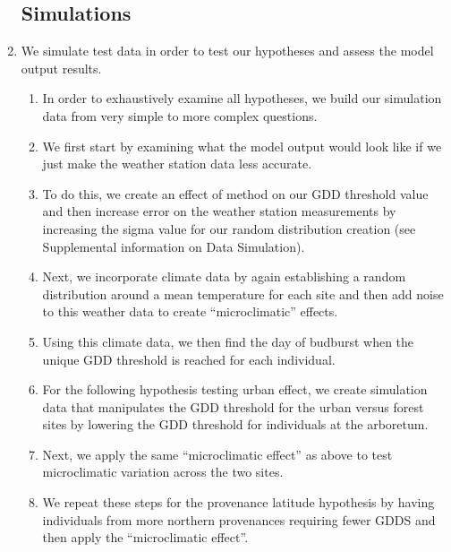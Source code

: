 \documentclass{article}\usepackage[]{graphicx}\usepackage[]{color}
\begin{document}
\begin{enumerate}
\subsection*{Simulations}
\item We simulate test data in order to test our hypotheses and assess the model output results. 
  \begin{enumerate}
  \item In order to exhaustively examine all hypotheses, we build our simulation data from very simple to more complex questions.
  \item We first start by examining what the model output would look like if we just make the weather station data less accurate.
  \item To do this, we create an effect of method on our GDD threshold value and then increase error on the weather station measurements by increasing the sigma value for our random distribution creation (see Supplemental information on Data Simulation). 
  \item Next, we incorporate climate data by again establishing a random distribution around a mean temperature for each site and then add noise to this weather data to create ``microclimatic'' effects. 
  \item Using this climate data, we then find the day of budburst when the unique GDD threshold is reached for each individual. 
  \item For the following hypothesis testing urban effect, we create simulation data that manipulates the GDD threshold for the urban versus forest sites by lowering the GDD threshold for individuals at the arboretum. 
  \item Next, we apply the same ``microclimatic effect'' as above to test microclimatic variation across the two sites. 
  \item We repeat these steps for the provenance latitude hypothesis by having individuals from more northern provenances requiring fewer GDDS and then apply the ``microclimatic effect''.
  \end{enumerate}


\end{enumerate}
\end{document}
